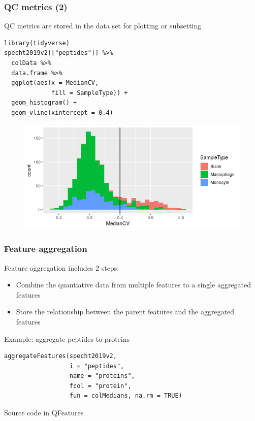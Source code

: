 \documentclass{beamer}
\newcommand{\hcode}[2][lgray]{{\ttfamily\color{vdgray}\colorbox{#1}{#2}}}
\newcommand{\frametitlesection}[1]{\frametitle{\centering #1 \footnotesize \hspace{0pt plus 1 filll} \insertsection}}
\begin{document}
\begin{frame}[fragile]
    \frametitlesection{QC metrics (2)}

    QC metrics are stored in the data set for plotting or subsetting
    
    \begin{lstlisting}[basicstyle = \scriptsize\ttfamily\color{vdgray}]
library(tidyverse)
specht2019v2[["peptides"]] %>%
  colData %>%
  data.frame %>%
  ggplot(aes(x = MedianCV, 
             fill = SampleType)) +
  geom_histogram() +
  geom_vline(xintercept = 0.4)
    \end{lstlisting}
    
    \begin{figure}
        \centering
        \includegraphics[width=.7\linewidth]{figs/medianCV.png}
    \end{figure}
\end{frame}

\begin{frame}[fragile]
    \frametitlesection{Feature aggregation}
    Feature aggregation includes 2 steps:
    \begin{itemize}
        \item{Combine the quantiative data from multiple features to a single 
        aggregated features}
        \item{Store the relationship between the parent features and the 
        aggregated features}
    \end{itemize}
    
    Example: aggregate peptides to proteins
    
    \begin{lstlisting}
aggregateFeatures(specht2019v2,
                  i = "peptides",
                  name = "proteins", 
                  fcol = "protein", 
                  fun = colMedians, na.rm = TRUE)
    \end{lstlisting}
    
    Source code in \hcode{QFeatures}
    
\end{frame}
\end{document}
